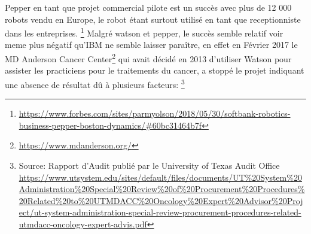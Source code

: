 Pepper en tant que projet commercial pilote est un succès avec plus de 12 000 robots vendu en
Europe, le robot étant surtout utilisé en tant que receptionniste dans les entreprises.
\footnote{\url{https://www.forbes.com/sites/parmyolson/2018/05/30/softbank-robotics-business-pepper-boston-dynamics/\#60bc31464b7f}}
\newline
Malgré watson et pepper, le succès semble relatif voir meme plus négatif qu'IBM ne semble laisser paraître,
en effet en Février 2017 le MD Anderson Cancer Center\footnote{\url{https://www.mdanderson.org/}}
qui avait décidé en 2013 d'utiliser Watson pour assister les practiciens pour le traitements
du cancer, a stoppé le projet indiquant une absence de résultat dû à plusieurs facteurs:
\footnote{Source: Rapport d'Audit publié par le University of Texas Audit Office
    \url{https://www.utsystem.edu/sites/default/files/documents/UT\%20System\%20Administration\%20Special\%20Review\%20of\%20Procurement\%20Procedures\%20Related\%20to\%20UTMDACC\%20Oncology\%20Expert\%20Advisor\%20Project/ut-system-administration-special-review-procurement-procedures-related-utmdacc-oncology-expert-advis.pdf}}
\newline

